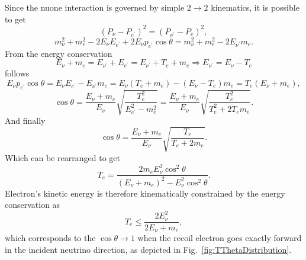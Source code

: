 Since the \gls{nuone} interaction is governed by simple $2\rightarrow 2$ kinematics, it is possible to get
\begin{equation}
\left(P_{\nu}-P_{e^{\prime}}\right)^2=\left(P_{\nu^{\prime}}-P_e\right)^2,
\end{equation}
\begin{equation}
m_{\nu}^2+m_e^2-2E_{\nu}E_{e^{\prime}}+2E_{\nu}p_{e^{\prime}}\cos\theta=m_{\nu}^2+m_e^2-2E_{\nu^{\prime}}m_e.
\end{equation}
From the energy conservation
\begin{equation}
E_{\nu}+m_e=E_{\nu^{\prime}}+E_{e^{\prime}}=E_{\nu^{\prime}}+T_e+m_e\Rightarrow E_{\nu^{\prime}}=E_{\nu}-T_e
\end{equation}
follows
\begin{equation}
E_{\nu}p_{e^{\prime}}\cos\theta=E_{\nu}E_{e^{\prime}}-E_{\nu^{\prime}}m_e=E_{\nu}\left(T_e+m_e\right)-\left(E_{\nu}-T_e\right)m_e=T_e\left(E_{\nu}+m_e\right),
\end{equation}
\begin{equation}
\cos\theta=\frac{E_{\nu}+m_e}{E_{\nu}}\sqrt{\frac{T_e^2}{E_{e^{\prime}}^2-m_e^2}}=\frac{E_{\nu}+m_e}{E_{\nu}}\sqrt{\frac{T_e^2}{T_e^2+2T_em_e}}.
\end{equation}
And finally
\begin{equation}\label{eq:ThetaTRelation}
\cos\theta=\frac{E_{\nu}+m_e}{E_{\nu}}\sqrt{\frac{T_e}{T_e+2m_e}}.
\end{equation}
Which can be rearranged to get
\begin{equation}\label{eq:TThetaRelation}
T_e=\frac{2m_eE_\nu^2\cos^2\theta}{\left(E_\nu+m_e\right)^2-E_\nu^2\cos^2\theta}.
\end{equation}
Electron's kinetic energy is therefore kinematically constrained by the energy conservation as
\begin{equation}
T_e\leq\frac{2E_{\nu}^2}{2E_{\nu}+m_e},
\end{equation}
which corresponds to the $\cos\theta\rightarrow 1$ when the recoil electron goes exactly forward in the incident neutrino direction, as depicted in Fig.~\ref{fig:TThetaDistribution}.

